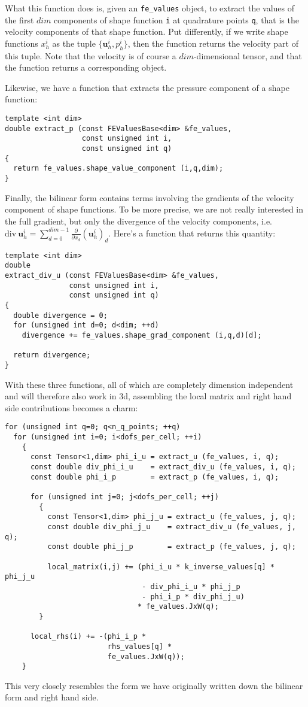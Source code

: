 \documentclass{article}
\renewcommand{\vec}[1]{\mathbf{#1}}
\begin{document}
What this function does is, given an \texttt{fe\_values} object, to extract
the values of the first $dim$ components of shape function \texttt{i} at
quadrature points \texttt{q}, that is the velocity components of that shape
function. Put differently, if we write shape functions $x_h^i$ as the tuple
$\{\vec u_h^i,p_h^i\}$, then the function returns the velocity part of this
tuple. Note that the velocity is of course a $dim$-dimensional tensor, and
that the function returns a corresponding object.

Likewise, we have a function that extracts the pressure component of a shape
function:
\begin{verbatim}
template <int dim>
double extract_p (const FEValuesBase<dim> &fe_values,
                  const unsigned int i,
                  const unsigned int q)
{
  return fe_values.shape_value_component (i,q,dim);
}
\end{verbatim}
Finally, the bilinear form contains terms involving the gradients of the
velocity component of shape functions. To be more precise, we are not really
interested in the full gradient, but only the divergence of the velocity
components, i.e. $\text{div}\ \vec u_h^i=\sum_{d=0}^{dim-1} \frac \partial
{\partial x_d} (\vec
u_h^i)_d$. Here's a function that returns this quantity:
\begin{verbatim}
template <int dim>
double
extract_div_u (const FEValuesBase<dim> &fe_values,
               const unsigned int i,
               const unsigned int q)
{
  double divergence = 0;
  for (unsigned int d=0; d<dim; ++d)
    divergence += fe_values.shape_grad_component (i,q,d)[d];

  return divergence;
}
\end{verbatim}

With these three functions, all of which are completely dimension independent
and will therefore also work in 3d, assembling the local matrix and right hand
side contributions becomes a charm:
\begin{verbatim}
for (unsigned int q=0; q<n_q_points; ++q) 
  for (unsigned int i=0; i<dofs_per_cell; ++i)
    {
      const Tensor<1,dim> phi_i_u = extract_u (fe_values, i, q);
      const double div_phi_i_u    = extract_div_u (fe_values, i, q);
      const double phi_i_p        = extract_p (fe_values, i, q);
           
      for (unsigned int j=0; j<dofs_per_cell; ++j)
        {
          const Tensor<1,dim> phi_j_u = extract_u (fe_values, j, q);
          const double div_phi_j_u    = extract_div_u (fe_values, j, q);
          const double phi_j_p        = extract_p (fe_values, j, q);
               
          local_matrix(i,j) += (phi_i_u * k_inverse_values[q] * phi_j_u
                                - div_phi_i_u * phi_j_p
                                - phi_i_p * div_phi_j_u)
                               * fe_values.JxW(q);
        }

      local_rhs(i) += -(phi_i_p *
                        rhs_values[q] *
                        fe_values.JxW(q));
    }
\end{verbatim}
This very closely resembles the form we have originally written down the
bilinear form and right hand side.
\end{document}
